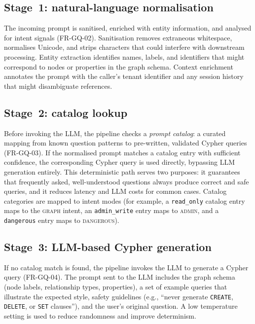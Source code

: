 \documentclass[a4paper]{sapthesis}
\begin{document}
\subsection{Stage~1: natural-language normalisation}

The incoming prompt is sanitised, enriched with entity information, and
analysed for intent signals (FR-GQ-02).  Sanitisation removes extraneous
whitespace, normalises Unicode, and strips characters that could interfere
with downstream processing.  Entity extraction identifies names, labels,
and identifiers that might correspond to nodes or properties in the graph
schema.  Context enrichment annotates the prompt with the caller's tenant
identifier and any session history that might disambiguate references.

\subsection{Stage~2: catalog lookup}

Before invoking the LLM, the pipeline checks a \emph{prompt catalog}: a
curated mapping from known question patterns to pre-written, validated
Cypher queries (FR-GQ-03).  If the normalised prompt matches a catalog
entry with sufficient confidence, the corresponding Cypher query is used
directly, bypassing LLM generation entirely.  This deterministic path
serves two purposes: it guarantees that frequently asked, well-understood
questions always produce correct and safe queries, and it reduces latency
and LLM costs for common cases.  Catalog categories are mapped to intent
modes (for example, a \texttt{read\_only} catalog entry maps to the
\textsc{graph} intent, an \texttt{admin\_write} entry maps to
\textsc{admin}, and a \texttt{dangerous} entry maps to \textsc{dangerous}).

\subsection{Stage~3: LLM-based Cypher generation}

If no catalog match is found, the pipeline invokes the LLM to generate a
Cypher query (FR-GQ-04).  The prompt sent to the LLM includes the graph
schema (node labels, relationship types, properties), a set of example
queries that illustrate the expected style, safety guidelines (e.g.,
``never generate \texttt{CREATE}, \texttt{DELETE}, or \texttt{SET}
clauses''), and the user's original question.  A low temperature
setting is used to reduce randomness and improve determinism.
\end{document}
